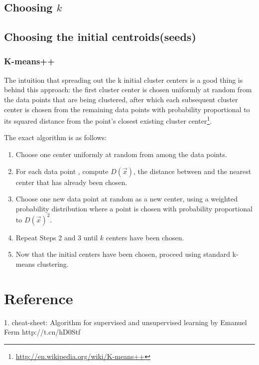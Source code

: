 \subsection{Choosing $k$}


\subsection{Choosing the initial centroids(seeds)}

\subsubsection{K-means++}
The intuition that spreading out the k initial cluster centers is a good thing is behind this approach: the first cluster center is chosen uniformly at random from the data points that are being clustered, after which each subsequent cluster center is chosen from the remaining data points with probability proportional to its squared distance from the point's closest existing cluster center\footnote{\url{http://en.wikipedia.org/wiki/K-means++}}.

The exact algorithm is as follows:
\begin{enumerate}
\item Choose one center uniformly at random from among the data points.
\item For each data point , compute $D(\vec{x})$, the distance between  and the nearest center that has already been chosen.
\item Choose one new data point at random as a new center, using a weighted probability distribution where a point  is chosen with probability proportional to $D(\vec{x})^2$.
\item Repeat Steps 2 and 3 until $k$ centers have been chosen.
\item Now that the initial centers have been chosen, proceed using standard k-means clustering.
\end{enumerate}


\section{Reference}
1. cheat-sheet: Algorithm for supervised and unsupervised learning by Emanuel Ferm http://t.cn/hD0Stf
